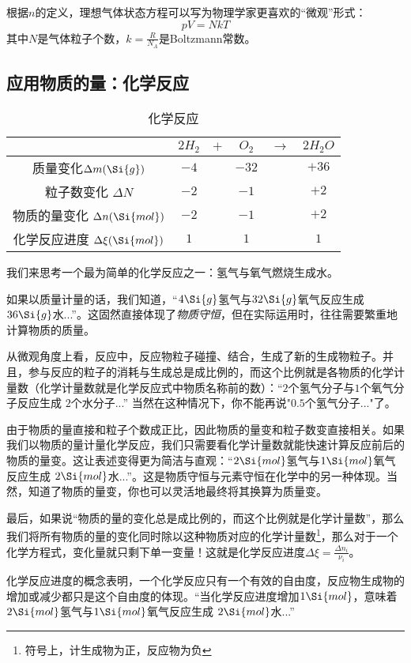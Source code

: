 根据$n$的定义，理想气体状态方程可以写为物理学家更喜欢的“微观”形式：
$$pV=NkT$$
其中$N$是气体粒子个数，$k=\frac{R}{N_A}$是Boltzmann常数。

\subsection{应用物质的量：化学反应}
\begin{table}[ht]
\centering
\caption{化学反应}\label{MOLE_tab1}
\begin{tabular}{|c|c|c|c|c|c|}
\hline
 & $2H_2$ & $+$ & $O_2$ & $\rightarrow$ & $2H_2O$ \\
\hline
质量变化$\Delta m (\Si{g})$ & $-4$ & & $-32$ & & $+36$ \\
\hline
粒子数变化 $\Delta N$ & $-2$ &  & $-1$ & & $+2$ \\
\hline
物质的量变化 $\Delta n (\Si{mol})$ & $-2$ &  & $-1$ & & $+2$ \\
\hline
化学反应进度 $\Delta \xi (\Si{mol})$ & $1$ & & $1$ & & $1$ \\
\hline
\end{tabular}
\end{table}
我们来思考一个最为简单的化学反应之一：氢气与氧气燃烧生成水。

如果以质量计量的话，我们知道，“$4\Si{g}$氢气与$32\Si{g}$氧气反应生成 $36\Si{g}$水...”。这固然直接体现了\textsl{物质守恒}，但在实际运用时，往往需要繁重地计算物质的质量。

从微观角度上看，反应中，反应物粒子碰撞、结合，生成了新的生成物粒子。并且，参与反应的粒子的消耗与生成总是成比例的，而这个比例就是各物质的化学计量数（化学计量数就是化学反应式中物质名称前的数）：“$2$个氢气分子与$1$个氧气分子反应生成 $2$个水分子...” 当然在这种情况下，你不能再说"$0.5$个氢气分子..."了。

由于物质的量直接和粒子个数成正比，因此物质的量变和粒子数变直接相关。如果我们以物质的量计量化学反应，我们只需要看化学计量数就能快速计算反应前后的物质的量变。这让表述变得更为简洁与直观：“$2\Si{mol}$氢气与$1\Si{mol}$氧气反应生成 $2\Si{mol}$水...”。这是物质守恒与元素守恒在化学中的另一种体现。当然，知道了物质的量变，你也可以灵活地最终将其换算为质量变。

最后，如果说“物质的量的变化总是成比例的，而这个比例就是化学计量数”，那么我们将所有物质的量的变化同时除以这种物质对应的化学计量数\footnote{符号上，计生成物为正，反应物为负}，那么对于一个化学方程式，变化量就只剩下单一变量！这就是化学反应进度$\Delta \xi = \frac{\Delta n_i}{\nu_i}$。

化学反应进度的概念表明，一个化学反应只有一个有效的自由度，反应物生成物的增加或减少都只是这个自由度的体现。“当化学反应进度增加$1\Si{mol}$，意味着$2\Si{mol}$氢气与$1\Si{mol}$氧气反应生成 $2\Si{mol}$水...”
